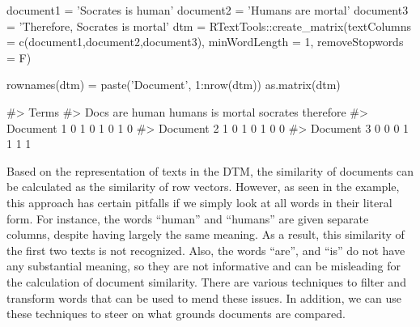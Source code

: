 \begin{Schunk}
\begin{Sinput}
document1 = 'Socrates is human'
document2 = 'Humans are mortal'
document3 = 'Therefore, Socrates is mortal'
dtm = RTextTools::create_matrix(textColumns = c(document1,document2,document3), 
                                minWordLength = 1, removeStopwords = F)

rownames(dtm) = paste('Document', 1:nrow(dtm))
as.matrix(dtm)
\end{Sinput}
\begin{Soutput}
#>             Terms
#> Docs         are human humans is mortal socrates therefore
#>   Document 1   0     1      0  1      0        1         0
#>   Document 2   1     0      1  0      1        0         0
#>   Document 3   0     0      0  1      1        1         1
\end{Soutput}
\end{Schunk}

Based on the representation of texts in the DTM, the similarity of
documents can be calculated as the similarity of row vectors. However,
as seen in the example, this approach has certain pitfalls if we simply
look at all words in their literal form. For instance, the words
``human'' and ``humans'' are given separate columns, despite having
largely the same meaning. As a result, this similarity of the first two
texts is not recognized. Also, the words ``are'', and ``is'' do not have
any substantial meaning, so they are not informative and can be
misleading for the calculation of document similarity. There are various
techniques to filter and transform words that can be used to mend these
issues. In addition, we can use these techniques to steer on what
grounds documents are compared.

